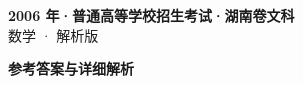 \documentclass[zihao=-4, a4paper]{ctexart}
\begin{document}
\begin{center}
  {\Large\bfseries 2006 年·普通高等学校招生考试·湖南卷文科}\\[4pt]
  {\large 数学 · 解析版}
\end{center}
\medskip
{}

\clearpage
{}
\begin{center}{\Large\bfseries 参考答案与详细解析}\end{center}
\medskip

\end{document}
